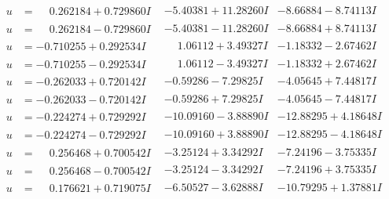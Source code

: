 \documentclass[1p]{elsarticle_modified}
\theoremstyle{definition}
\begin{document}
$$\begin{array}{c|c|c}
\begin{aligned}
u &= \phantom{-}0.262184 + 0.729860 I\end{aligned}
 & -5.40381 + 11.28260 I & -8.66884 - 8.74113 I \\ \hline\begin{aligned}
u &= \phantom{-}0.262184 - 0.729860 I\end{aligned}
 & -5.40381 - 11.28260 I & -8.66884 + 8.74113 I \\ \hline\begin{aligned}
u &= -0.710255 + 0.292534 I\end{aligned}
 & \phantom{-}1.06112 + 3.49327 I & -1.18332 - 2.67462 I \\ \hline\begin{aligned}
u &= -0.710255 - 0.292534 I\end{aligned}
 & \phantom{-}1.06112 - 3.49327 I & -1.18332 + 2.67462 I \\ \hline\begin{aligned}
u &= -0.262033 + 0.720142 I\end{aligned}
 & -0.59286 - 7.29825 I & -4.05645 + 7.44817 I \\ \hline\begin{aligned}
u &= -0.262033 - 0.720142 I\end{aligned}
 & -0.59286 + 7.29825 I & -4.05645 - 7.44817 I \\ \hline\begin{aligned}
u &= -0.224274 + 0.729292 I\end{aligned}
 & -10.09160 - 3.88890 I & -12.88295 + 4.18648 I \\ \hline\begin{aligned}
u &= -0.224274 - 0.729292 I\end{aligned}
 & -10.09160 + 3.88890 I & -12.88295 - 4.18648 I \\ \hline\begin{aligned}
u &= \phantom{-}0.256468 + 0.700542 I\end{aligned}
 & -3.25124 + 3.34292 I & -7.24196 - 3.75335 I \\ \hline\begin{aligned}
u &= \phantom{-}0.256468 - 0.700542 I\end{aligned}
 & -3.25124 - 3.34292 I & -7.24196 + 3.75335 I \\ \hline\begin{aligned}
u &= \phantom{-}0.176621 + 0.719075 I\end{aligned}
 & -6.50527 - 3.62888 I & -10.79295 + 1.37881 I \\ \hline\begin{aligned}

\end{aligned}
\end{array}$$
\end{document}
